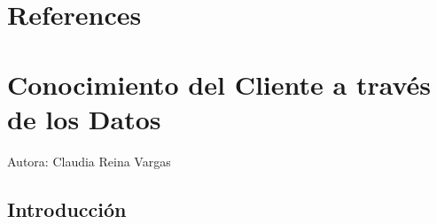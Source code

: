 \documentclass[
  letterpaper,
  DIV=11,
  numbers=noendperiod]{scrreprt}
\begin{document}

\hypertarget{references}{%
\chapter{References}\label{references}}


\hypertarget{conocimiento-del-cliente-a-travuxe9s-de-los-datos}{%
\chapter{Conocimiento del Cliente a través de los
Datos}\label{conocimiento-del-cliente-a-travuxe9s-de-los-datos}}

Autora: Claudia Reina Vargas

\hypertarget{introducciuxf3n-2}{%
\section{Introducción}\label{introducciuxf3n-2}}
\end{document}
